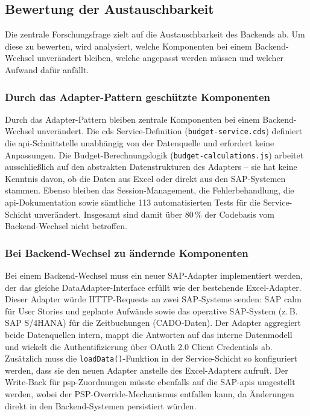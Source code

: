 \subsection{Bewertung der Austauschbarkeit}

Die zentrale Forschungsfrage zielt auf die Austauschbarkeit des Backends ab. Um diese zu bewerten, wird analysiert, welche Komponenten bei einem Backend-Wechsel unverändert bleiben, welche angepasst werden müssen und welcher Aufwand dafür anfällt.

\subsubsection{Durch das Adapter-Pattern geschützte Komponenten}

Durch das Adapter-Pattern bleiben zentrale Komponenten bei einem Backend-Wechsel unverändert. Die \gls{cds} Service-Definition (\texttt{budget-service.cds}) definiert die \gls{api}-Schnittstelle unabhängig von der Datenquelle und erfordert keine Anpassungen. Die Budget-Berechnungslogik (\texttt{budget-calculations.js}) arbeitet ausschließlich auf den abstrakten Datenstrukturen des Adapters -- sie hat keine Kenntnis davon, ob die Daten aus Excel oder direkt aus den SAP-Systemen stammen. Ebenso bleiben das Session-Management, die Fehlerbehandlung, die \gls{api}-Dokumentation sowie sämtliche 113 automatisierten Tests für die Service-Schicht unverändert. Insgesamt sind damit über 80\,\% der Codebasis vom Backend-Wechsel nicht betroffen.

\subsubsection{Bei Backend-Wechsel zu ändernde Komponenten}

Bei einem Backend-Wechsel muss ein neuer SAP-Adapter implementiert werden, der das gleiche DataAdapter-Interface erfüllt wie der bestehende Excel-Adapter. Dieser Adapter würde HTTP-Requests an zwei SAP-Systeme senden: SAP \gls{calm} für User Stories und geplante Aufwände sowie das operative SAP-System (z.\,B. SAP S/4HANA) für die Zeitbuchungen (CADO-Daten). Der Adapter aggregiert beide Datenquellen intern, mappt die Antworten auf das interne Datenmodell und wickelt die Authentifizierung über OAuth 2.0 Client Credentials ab. Zusätzlich muss die \texttt{loadData()}-Funktion in der Service-Schicht so konfiguriert werden, dass sie den neuen Adapter anstelle des Excel-Adapters aufruft. Der Write-Back für \gls{psp}-Zuordnungen müsste ebenfalls auf die SAP-\gls{api}s umgestellt werden, wobei der PSP-Override-Mechanismus entfallen kann, da Änderungen direkt in den Backend-Systemen persistiert würden.

